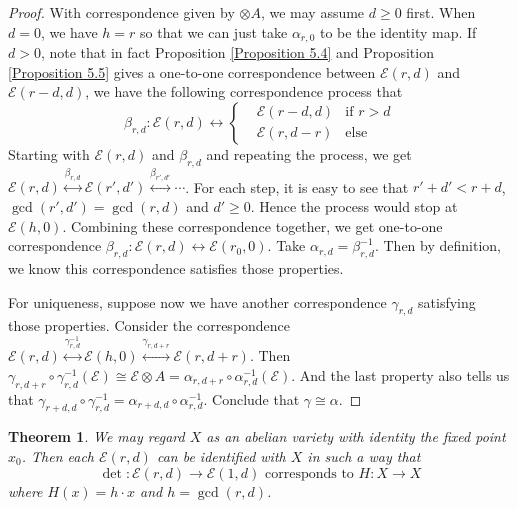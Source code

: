 \documentclass{ctexart}
\newtheorem{theorem}{Theorem}[section]
\begin{document}
\begin{proof}
    With correspondence given by $\otimes A$, we may assume $d \ge 0$ first.
    When $d = 0$, we have $h = r$ so that we can just take $\alpha_{r, 0}$ to be the identity map.
    If $d > 0$, note that in fact Proposition \ref{Proposition 5.4} and Proposition \ref{Proposition 5.5} gives a one-to-one correspondence between $\mathcal{E}(r, d)$ and $\mathcal{E}(r - d, d)$,
    we have the following correspondence process that
    \begin{equation}
        \beta_{r, d}: \mathcal{E}(r, d) \longleftrightarrow
        \left\{
            \begin{aligned}
                & \mathcal{E}(r - d, d) & \text{if } r > d \\
                & \mathcal{E}(r, d - r) & \text{else}
            \end{aligned}
        \right.
    \end{equation}
    Starting with $\mathcal{E}(r, d)$ and $\beta_{r, d}$ and repeating the process, we get $\mathcal{E}(r, d) \overset{\beta_{r, d}}{\longleftrightarrow} \mathcal{E}(r', d') \overset{\beta_{r', d'}}{\longleftrightarrow} \cdots$.
    For each step, it is easy to see that $r' + d' < r + d$, $\gcd (r', d') = \gcd(r, d)$ and $d' \ge 0$.
    Hence the process would stop at $\mathcal{E}(h, 0)$.
    Combining these correspondence together, we get one-to-one correspondence $\beta_{r, d}: \mathcal{E}(r, d) \longleftrightarrow \mathcal{E}(r_{0}, 0)$.
    Take $\alpha_{r, d} = \beta_{r, d}^{-1}$.
    Then by definition, we know this correspondence satisfies those properties.
    \par
    For uniqueness, suppose now we have another correspondence $\gamma_{r, d}$ satisfying those properties.
    Consider the correspondence $\mathcal{E}(r, d) \overset{\gamma_{r, d}^{-1}}{\longleftrightarrow} \mathcal{E}(h, 0) \overset{\gamma_{r, d + r}}{\longleftrightarrow} \mathcal{E}(r, d + r)$.
    Then $\gamma_{r, d + r} \circ \gamma_{r, d}^{-1}(\mathcal{E}) \cong \mathcal{E} \otimes A = \alpha_{r, d + r} \circ \alpha_{r, d}^{-1}(\mathcal{E})$.
    And the last property also tells us that $\gamma_{r + d, d} \circ \gamma_{r, d}^{-1} = \alpha_{r + d, d} \circ \alpha_{r, d}^{-1}$.
    Conclude that $\gamma \cong \alpha$.
\end{proof}
\begin{theorem}
    We may regard $X$ as an abelian variety with identity the fixed point $x_{0}$.
    Then each $\mathcal{E}(r, d)$ can be identified with $X$ in such a way that
    \begin{equation}
        \det: \mathcal{E}(r, d) \rightarrow \mathcal{E}(1, d) \text{ corresponds to } H: X \rightarrow X
    \end{equation}
    where $H(x) = h \cdot x$ and $h = \gcd (r, d)$.
    \label{Theorem 5.4}
\end{theorem}
\end{document}
